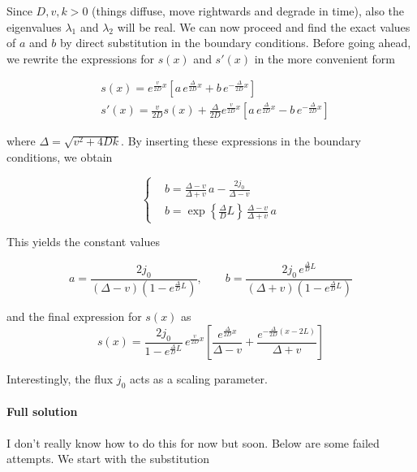 \documentclass[a4paper, 10pt]{article}
\begin{document}
  Since $D, v, k > 0$ (things diffuse, move rightwards and degrade in time),
  also the eigenvalues $\lambda_1$ and $\lambda_2$ will be real.
  We can now proceed and find the exact values of $a$ and $b$ by direct
  substitution in the boundary conditions. Before going ahead, we rewrite the
  expressions for $s(x)$ and $s'(x)$ in the more convenient form

  \begin{align}
    &s(x) = e^{\frac{v}{2D}x}\left[a \, e^{\frac{\Delta}{2D}x} + b \,
      e^{-\frac{\Delta}{2D}x}\right]\\[6pt]
    &s'(x) = \frac{v}{2D}s(x) + \frac{\Delta}{2D} e^{\frac{v}{2D}x}\left[a \,
      e^{\frac{\Delta}{2D}x} - b \, e^{-\frac{\Delta}{2D}x}\right]
  \end{align}

  where $\Delta = \sqrt{v^2 + 4 D k}$. By inserting these expressions in the
  boundary conditions, we obtain

  \begin{equation*}
    \left\{\begin{aligned}
    &b = \frac{\Delta - v}{\Delta + v} \, a - \frac{2j_0}{\Delta - v}\\[6pt]
    &b = \exp\left\{\frac{\Delta}{D}L\right\} \, \frac{\Delta - v}{\Delta + v}
    \,a
    \end{aligned}\right.
  \end{equation*}

  This yields the constant values

  \begin{equation}
    a = \frac{2j_0}{(\Delta - v)(1-e^{\frac{\Delta}{D}L})},
    \qquad
    b = \frac{2j_0 \, e^{\frac{\Delta}{D}L}}
    {(\Delta + v)(1-e^{\frac{\Delta}{D}L})}
  \end{equation}
  
  and the final expression for $s(x)$ as
  \begin{equation}
    s(x) = \frac{2j_0}{1-e^{\frac{\Delta}{D}L}} \, e^{\frac{v}{2D}x}
    \left[\frac{e^{\frac{\Delta}{2D}x}}{\Delta - v} +
    \frac{e^{-\frac{\Delta}{2D}(x-2L)}}{\Delta + v}\right]
  \end{equation}

  Interestingly, the flux $j_0$ acts as a scaling parameter.

  \paragraph{Full solution} I don't really know how to do this for now but soon.
  Below are some failed attempts. We start with the substitution
\end{document}
